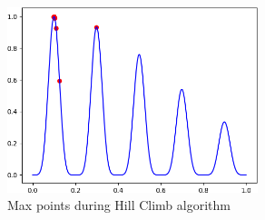 \documentclass[12pt]{article}
\begin{document}
\newpage
\begin{figure}[H]
\centering
\noindent\includegraphics[width=0.65\textwidth]{images/p1_hc_hop}
\caption{Max points during Hill Climb algorithm}
\label{fig:p1_hop}
\end{figure}
\end{document}
